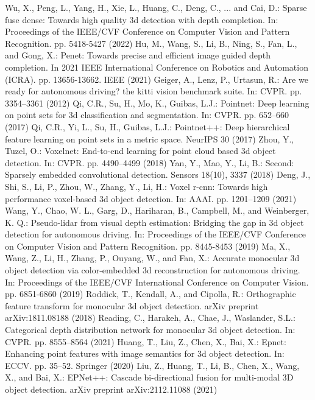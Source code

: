 \begin{sloppypar}
\begin{thebibliography}{33}
        Wu, X., Peng, L., Yang, H., Xie, L., Huang, C., Deng, C., ... 
    and Cai, D.: Sparse fuse dense: Towards high quality 3d detection with depth completion. In: Proceedings of the IEEE/CVF Conference on Computer Vision and Pattern Recognition. pp. 5418-5427 (2022)
        Hu, M., Wang, S., Li, B., Ning, S., Fan, L., and Gong, X.: 
    Penet: Towards precise and efficient image guided depth completion. In 2021 IEEE International Conference on Robotics and Automation (ICRA). pp. 13656-13662. IEEE (2021)
        Geiger, A., Lenz, P., Urtasun, R.: Are we ready for 
    autonomous driving? the kitti vision benchmark suite. In: CVPR. pp. 3354–3361 (2012)
        Qi, C.R., Su, H., Mo, K., Guibas, L.J.: Pointnet: Deep 
    learning on point sets for 3d classification and segmentation. In: CVPR. pp. 652–660 (2017)
        Qi, C.R., Yi, L., Su, H., Guibas, L.J.: Pointnet++: Deep 
    hierarchical feature learning on point sets in a metric space. NeurIPS 30 (2017)
        Zhou, Y., Tuzel, O.: Voxelnet: End-to-end learning for point 
    cloud based 3d object detection. In: CVPR. pp. 4490–4499 (2018)
	Yan, Y., Mao, Y., Li, B.: Second: Sparsely embedded convolutional detection. Sensors 18(10), 3337 (2018)
	Deng, J., Shi, S., Li, P., Zhou, W., Zhang, Y., Li, H.: Voxel r-cnn: Towards high performance voxel-based 3d object detection. In: AAAI. pp. 1201–1209 (2021)
	Wang, Y., Chao, W. L., Garg, D., Hariharan, B., Campbell, M., and Weinberger, K. Q.: Pseudo-lidar from visual depth estimation: Bridging the gap in 3d object detection for autonomous driving. In: Proceedings of the IEEE/CVF Conference on Computer Vision and Pattern Recognition. pp. 8445-8453 (2019)
	Ma, X., Wang, Z., Li, H., Zhang, P., Ouyang, W., and Fan, X.: Accurate monocular 3d object detection via color-embedded 3d reconstruction for autonomous driving. In: Proceedings of the IEEE/CVF International Conference on Computer Vision. pp. 6851-6860 (2019)
	Roddick, T., Kendall, A., and Cipolla, R.: Orthographic feature transform for monocular 3d object detection. arXiv preprint arXiv:1811.08188 (2018)
	Reading, C., Harakeh, A., Chae, J., Waslander, S.L.: Categorical depth distribution network for monocular 3d object detection. In: CVPR. pp. 8555–8564 (2021)
	Huang, T., Liu, Z., Chen, X., Bai, X.: Epnet: Enhancing point features with image semantics for 3d object detection. In: ECCV. pp. 35–52. Springer (2020)
	Liu, Z., Huang, T., Li, B., Chen, X., Wang, X., and Bai, X.: EPNet++: Cascade bi-directional fusion for multi-modal 3D object detection. arXiv preprint arXiv:2112.11088 (2021)

\end{thebibliography}
\end{sloppypar}
